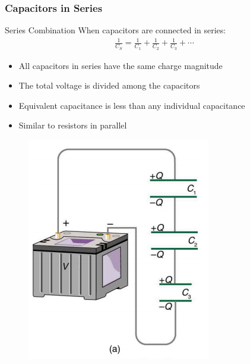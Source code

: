 \documentclass{beamer}
\begin{document}
\begin{frame}
    \frametitle{Capacitors in Series}
    
    \begin{block}{Series Combination}
        When capacitors are connected in series:
        \begin{align}
            \frac{1}{C_S} = \frac{1}{C_1} + \frac{1}{C_2} + \frac{1}{C_3} + \cdots
        \end{align}
    \end{block}
    
    \begin{itemize}
        \item All capacitors in series have the same charge magnitude
        \item The total voltage is divided among the capacitors
        \item Equivalent capacitance is less than any individual capacitance
        \item Similar to resistors in parallel
    \end{itemize}
    
    \begin{center}
        \begin{figure}
            \centering
            \includegraphics[width=0.3\linewidth]{3seriescap.png}
        \end{figure}
    \end{center}
\end{frame}
\end{document}
